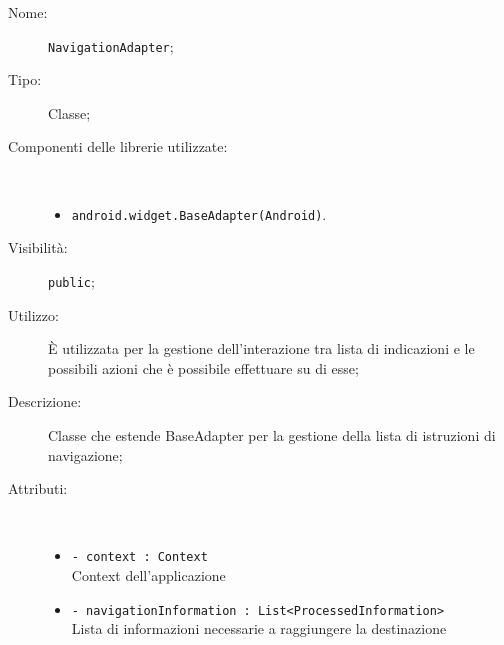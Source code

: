 \documentclass[../DefinizioneDiProdotto.tex]{subfiles}
\begin{document}
\begin{description}
	\item[Nome:] \texttt{NavigationAdapter};
	\item[Tipo:] Classe;
	\item[Componenti delle librerie utilizzate:] \
	\begin{itemize}
		\item \texttt{android.widget.BaseAdapter(Android)}.
		
	\end{itemize}
	\item[Visibilità:] \texttt{public};
	\item[Utilizzo:] È utilizzata per la gestione dell'interazione tra lista di indicazioni e le possibili azioni che è possibile effettuare su di esse;
	\item[Descrizione:] Classe che estende BaseAdapter per la gestione della lista di istruzioni di navigazione;
	\item[Attributi:] \
	\begin{itemize}
		\item \texttt{- context : Context}\\
		Context dell'applicazione
		
		\item \texttt{- navigationInformation : List<ProcessedInformation>}\\
		Lista di informazioni necessarie a raggiungere la destinazione
		

\end{itemize}
\end{description}
\end{document}
